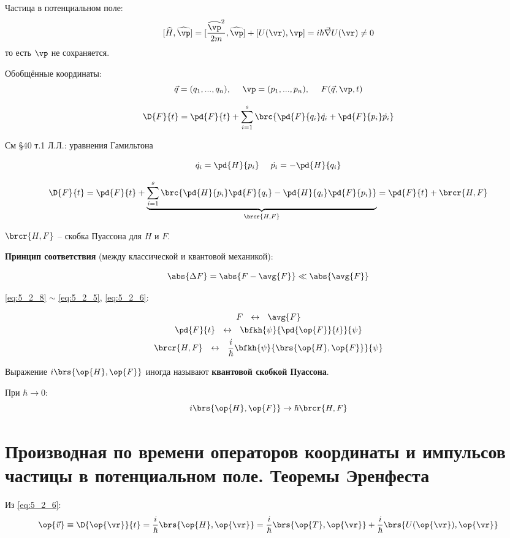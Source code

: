 Частица в потенциальном поле:
\begin{equation}
\label{eq:5_2_7}
[\widehat{H}, \widehat{\vp}] = [\frac{\widehat{\vp}^2}{2m}, \widehat{\vp}] + [U(\vr), \vp] = i \hbar \vec{\nabla} U(\vr) \ne 0
\end{equation}
то есть $\vp$ не сохраняется.

Обобщённые координаты:
$$
\vec{q} = (q_1, ..., q_n),~~~~ \vp = (p_1, ..., p_n), ~~~~ F(\vec{q}, \vp, t)
$$

$$
\D{F}{t} = \pd{F}{t} + \sum_{i=1}^{s}\brc{\pd{F}{q_i} \dot{q_i} + \pd{F}{p_i} \dot{p_i} }
$$

См \S 40 т.1 Л.Л.: уравнения Гамильтона

$$
\dot{q_i} = \pd{H}{p_i} ~~~~ \dot{p_i} = -\pd{H}{q_i}
$$

\begin{equation}
\label{eq:5_2_8}
\D{F}{t}= \pd{F}{t} + \underbrace{ \sum_{i=1}^{s} \brc{ \pd{H}{p_i} \pd{F}{q_i} - \pd{H}{q_i} \pd{F}{p_i} } }_{\brcr{H, F}} = \pd{F}{t} + \brcr{H, F}
\end{equation}

$\brcr{H, F}$ -- скобка Пуассона для $H$ и $F$.

\textbf{Принцип соответствия} (между классической и квантовой механикой):

$$
\abs{\Delta F} = \abs{F - \avg{F}} \ll \abs{\avg{F}}
$$

\eqref{eq:5_2_8} $\sim$ \eqref{eq:5_2_5}, \eqref{eq:5_2_6}:

$$
\begin{gathered}
F ~~\leftrightarrow~~ \avg{F} \\
\pd{F}{t} ~~\leftrightarrow~~ \bfkh{\psi}{\pd{\op{F}}{t}}{\psi} \\
\brcr{H, F} ~~\leftrightarrow~~ \frac{i}{\hbar} \bfkh{\psi}{ \brs{\op{H}, \op{F}} }{\psi}
\end{gathered}
$$

Выражение $i \brs{\op{H}, \op{F}}$ иногда называют \textbf{квантовой скобкой Пуассона}.

При $\hbar \to 0$:
$$
i \brs{\op{H}, \op{F}} \to \hbar \brcr{H, F}
$$


\section{Производная по времени операторов координаты и импульсов частицы в потенциальном поле. Теоремы Эренфеста}

Из \eqref{eq:5_2_6}:
$$
\op{\vec{v}} \equiv \D{\op{\vr}}{t} = \frac{i}{\hbar} \brs{\op{H}, \op{\vr}} = \frac{i}{\hbar} \brs{\op{T}, \op{\vr}} + \frac{i}{\hbar} \brs{U(\op{\vr}), \op{\vr}}
$$

